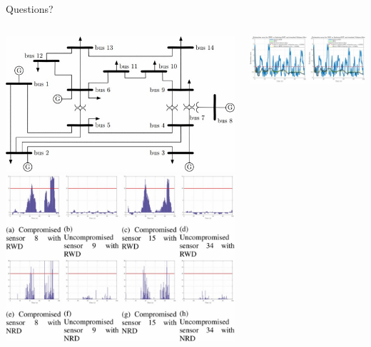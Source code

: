 \documentclass[aspectratio=169]{beamer}
\begin{document}
\section*{}
\begin{frame}{Questions?}
	\begin{columns}
		\begin{column}{0.3\textwidth}
			\centering
			\includegraphics[width=\columnwidth]{Images/Simulation_Power_Grid}
			\includegraphics[width=0.8\columnwidth]{Images/Sim_Error_Sensors}
		\end{column}
		\begin{column}{0.35\textwidth}
			\includegraphics[width=\columnwidth]{Images/Sim_Error_Comparrision_Unstealthy}

\end{column}
\end{columns}
\end{frame}
\end{document}
